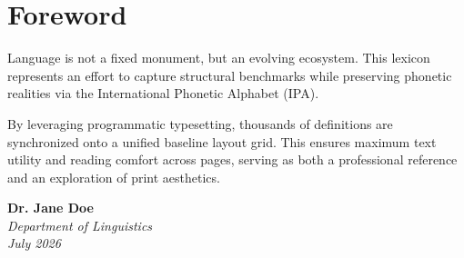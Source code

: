 \thispagestyle{plain} %
\section*{Foreword}

Language is not a fixed monument, but an evolving ecosystem. This lexicon represents an effort to capture structural benchmarks while preserving phonetic realities via the International Phonetic Alphabet (IPA). 

By leveraging programmatic typesetting, thousands of definitions are synchronized onto a unified baseline layout grid. This ensures maximum text utility and reading comfort across pages, serving as both a professional reference and an exploration of print aesthetics.

\vspace{2em}
\begin{flushright}
    \textbf{Dr. Jane Doe}\\
    \textit{Department of Linguistics}\\
    \textit{July 2026}
\end{flushright}

